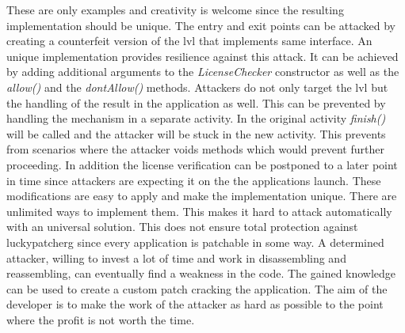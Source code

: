 These are only examples and creativity is welcome since the resulting implementation should be unique. \cite{developersSecuring}
\newline
The entry and exit points can be attacked by creating a counterfeit version of the \gls{lvl} that implements same interface.
An unique implementation provides resilience against this attack.
It can be achieved by adding additional arguments to the \textit{LicenseChecker} constructor as well as the \textit{allow()} and the \textit{dontAllow()} methods. \cite{developersSecuring}
\newline
Attackers do not only target the \gls{lvl} but the handling of the result in the application as well.
This can be prevented by handling the mechanism in a separate activity.
In the original activity \textit{finish()} will be called and the attacker will be stuck in the new activity.
This prevents from scenarios where the attacker voids methods which would prevent further proceeding.
In addition the license verification can be postponed to a later point in time since attackers are expecting it on the the applications launch. \cite{developersSecuring}
\newline
These modifications are easy to apply and make the implementation unique.
There are unlimited ways to implement them.
This makes it hard to attack automatically with an universal solution.
This does not ensure total protection against \gls{luckypatcherg} since every application is patchable in some way.
A determined attacker, willing to invest a lot of time and work in disassembling and reassembling, can eventually find a weakness in the code.
The gained knowledge can be used to create a custom patch cracking the application.
The aim of the developer is to make the work of the attacker as hard as possible to the point where the profit is not worth the time. \cite{developersSecuring}
